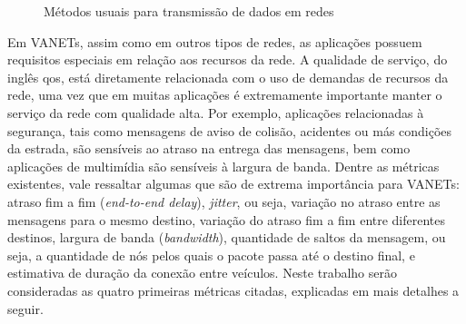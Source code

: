\begin{figure}[!ht]
{\begin{subfigure}{.3\textwidth}
\begin{tikzpicture}
    \end{tikzpicture}
\end{subfigure}} \hfill
 \hfill
\caption{\label{fig:metodos-transmissao} Métodos usuais para transmissão de dados em redes}
\end{figure}

Em VANETs, assim como em outros  tipos de redes, as aplicações possuem
requisitos especiais em relação aos  recursos da rede.  A qualidade de
serviço, do inglês  \gls{qos}, está diretamente relacionada  com o uso
de demandas  de recursos da rede,  uma vez que em  muitas aplicações é
extremamente importante manter  o serviço da rede  com qualidade alta.
Por exemplo, aplicações relacionadas  à segurança, tais como mensagens
de  aviso de  colisão,  acidentes  ou más  condições  da estrada,  são
sensíveis ao atraso  na entrega das mensagens, bem  como aplicações de
multimídia  são  sensíveis à  largura  de  banda. Dentre  as  métricas
existentes, vale ressaltar algumas que são de extrema importância para
VANETs: atraso fim a fim (\textit{end-to-end delay}), \textit{jitter},
ou seja, variação  no atraso entre as mensagens para  o mesmo destino,
variação do  atraso fim  a fim entre  diferentes destinos,  largura de
banda (\textit{bandwidth}), quantidade de saltos da mensagem, ou seja,
a quantidade de nós pelos quais o  pacote passa até o destino final, e
estimativa de duração da conexão  entre veículos. Neste trabalho serão
consideradas as quatro primeiras  métricas citadas, explicadas em mais
detalhes a seguir.

